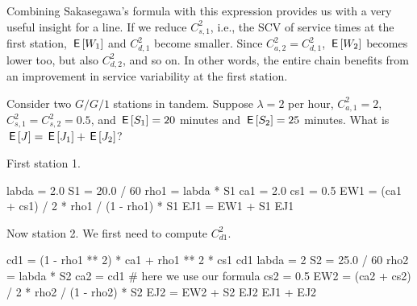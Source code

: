 Combining Sakasegawa's formula with this expression provides us with a  very useful insight for a line. 
If we reduce $C^2_{s,1}$, i.e., the SCV of service times at the first station,   $\,\mathsf{E}\left[W_1\right]$ and $C^2_{d,1}$ become smaller. Since  $C^2_{a,2}=C^2_{d,1}$, $\,\mathsf{E}\left[W_2\right]$ becomes lower too, but also $C^2_{d,2}$, and so on. 
In other words, the entire chain benefits from an improvement in service variability at  the first station.



\begin{exercise}\label{ex:l-127}
Consider two $G/G/1$ stations in tandem.
Suppose $\lambda=2$ per hour, $C_{a,1}^2=2$, $C_{s,1}^2=C_{s,2}^2 = 0.5$, and $\,\mathsf{E}\left[S_1\right]=20$ minutes and $\,\mathsf{E}\left[S_2\right]=25$ minutes.
What is $\,\mathsf{E}\left[J\right] = \,\mathsf{E}\left[J_1\right]+ \,\mathsf{E}\left[J_2\right]$? 
\begin{solution}
First station 1.
\begin{pyconsole}
labda = 2.0
S1 = 20.0 / 60
rho1 = labda * S1
ca1 = 2.0
cs1 = 0.5
EW1 = (ca1 + cs1) / 2 * rho1 / (1 - rho1) * S1
EJ1 = EW1 + S1
EJ1
\end{pyconsole}

Now station 2. We first need to compute $C_{d1}^2$. 

\begin{pyconsole}
cd1 = (1 - rho1 ** 2) * ca1 + rho1 ** 2 * cs1
cd1
labda = 2
S2 = 25.0 / 60
rho2 = labda * S2
ca2 = cd1  # here we use our formula
cs2 = 0.5
EW2 = (ca2 + cs2) / 2 * rho2 / (1 - rho2) * S2
EJ2 = EW2 + S2
EJ2
EJ1 + EJ2
\end{pyconsole}

\end{solution}
\end{exercise}





